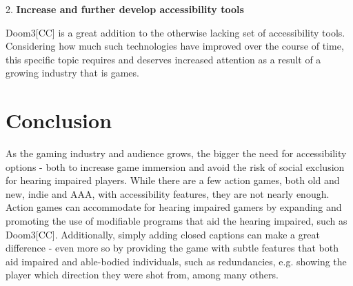 \documentclass{scrartcl}
\begin{document}
2.	\textbf{Increase and further develop accessibility tools}

\hspace{-4mm}Doom3[CC] is a great addition to the otherwise lacking set of accessibility tools. Considering how much such technologies have improved over the course of time, this specific topic requires and deserves increased attention as a result of a growing industry that is games. \cite{Fromme} 

\section{Conclusion}

As the gaming industry and audience grows, the bigger the need for accessibility options - both to increase game immersion and avoid the risk of social exclusion for hearing impaired players. While there are a few action games, both old and new, indie and AAA, with accessibility features, they are not nearly enough. Action games can accommodate for hearing impaired gamers by expanding and promoting the use of modifiable programs that aid the hearing impaired, such as Doom3[CC]. Additionally, simply adding closed captions can make a great difference - even more so by providing the game with subtle features that both aid impaired and able-bodied individuals, such as redundancies, e.g. showing the player which direction they were shot from, among many others.



\end{document}
